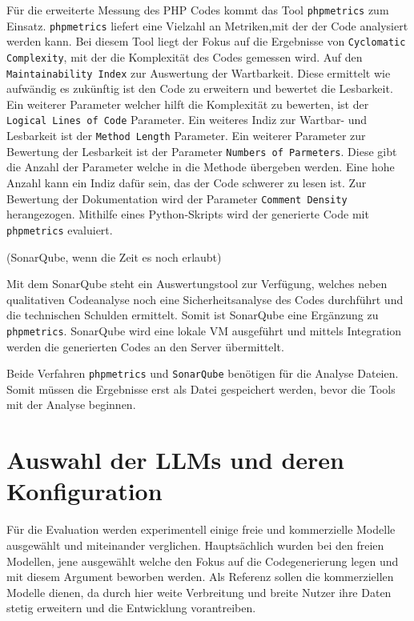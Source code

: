 Für die erweiterte Messung des PHP Codes kommt das Tool \texttt{phpmetrics} zum Einsatz. \texttt{phpmetrics} liefert eine Vielzahl an Metriken,mit der der Code analysiert werden kann. Bei diesem Tool liegt der Fokus auf die Ergebnisse von \texttt{Cyclomatic Complexity}, mit der die Komplexität des Codes gemessen wird. Auf den \texttt{Maintainability Index} zur Auswertung der Wartbarkeit. Diese ermittelt wie aufwändig es zukünftig ist den Code zu erweitern und bewertet die Lesbarkeit. Ein weiterer Parameter welcher hilft die Komplexität zu bewerten, ist der \texttt{Logical Lines of Code} Parameter. Ein weiteres Indiz zur Wartbar- und Lesbarkeit ist der \texttt{Method Length} Parameter. Ein weiterer Parameter zur Bewertung der Lesbarkeit ist der Parameter \texttt{Numbers of Parmeters}. Diese gibt die Anzahl der Parameter welche in die Methode übergeben werden. Eine hohe Anzahl kann ein Indiz dafür sein, das der Code schwerer zu lesen ist. Zur Bewertung der Dokumentation wird der Parameter \texttt{Comment Density} herangezogen.
Mithilfe eines Python-Skripts wird der generierte Code mit \texttt{phpmetrics} evaluiert.\vspace{0.2cm}

(SonarQube, wenn die Zeit es noch erlaubt)

Mit dem SonarQube steht ein Auswertungstool zur Verfügung, welches neben qualitativen Codeanalyse noch eine Sicherheitsanalyse des Codes durchführt und die technischen Schulden ermittelt. Somit ist SonarQube eine Ergänzung zu \texttt{phpmetrics}. SonarQube wird eine lokale VM ausgeführt und mittels Integration werden die generierten Codes an den Server übermittelt.\vspace{0.2cm}

Beide Verfahren \texttt{phpmetrics} und \texttt{SonarQube} benötigen für die Analyse Dateien. Somit müssen die Ergebnisse erst als Datei gespeichert werden, bevor die Tools mit der Analyse beginnen.



\section{Auswahl der LLMs und deren Konfiguration}

Für die Evaluation werden experimentell einige freie und kommerzielle Modelle ausgewählt und miteinander verglichen. Hauptsächlich wurden bei den freien Modellen, jene ausgewählt welche den Fokus auf die Codegenerierung legen und mit diesem Argument beworben werden. Als Referenz sollen die kommerziellen Modelle dienen, da durch hier weite Verbreitung und breite Nutzer ihre Daten stetig erweitern und die Entwicklung vorantreiben.\vspace{0.2cm}

